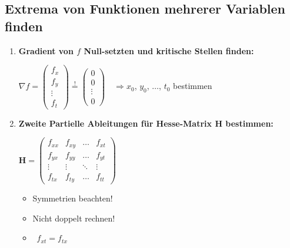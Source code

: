 \begin{enumerate}[itemsep=1ex]
\end{enumerate}

\subsection{Extrema von Funktionen mehrerer Variablen finden}

\begin{enumerate}[itemsep=1ex]
    \item \textbf{Gradient von $f$ Null-setzten und kritische Stellen finden:}
    
    $\nabla f=
    \begin{pmatrix}
        f_x\\
        f_y\\
        \vdots \\
        f_t
    \end{pmatrix} \stackrel{!}{=}
    \begin{pmatrix}
        0\\
        0\\
        \vdots \\
        0
    \end{pmatrix}
    \quad \Rightarrow x_0$, $y_0$, $\ldots$, $t_0$ bestimmen
    
    \item \textbf{Zweite Partielle Ableitungen für Hesse-Matrix H bestimmen:}
    
    \begin{minipage}[t]{0.48\columnwidth}
        $\mathbf{H}=\begin{pmatrix}
            f_{xx}&f_{xy}&\ldots &f_{xt}\\
            f_{yx}&f_{yy}&\ldots&f_{yt}\\
            \vdots &\vdots &\ddots &\vdots \\
            f_{tx}&f_{ty}&\ldots&f_{tt}
        \end{pmatrix}$
    \end{minipage}\hfill
    \begin{minipage}[c]{0.48\columnwidth}
        \begin{itemize}
            \item Symmetrien beachten!
            \item Nicht doppelt rechnen!
            \item[] \textrightarrow\ $f_{xt} = f_{tx}$
        \end{itemize}
    \end{minipage}


\end{enumerate}

